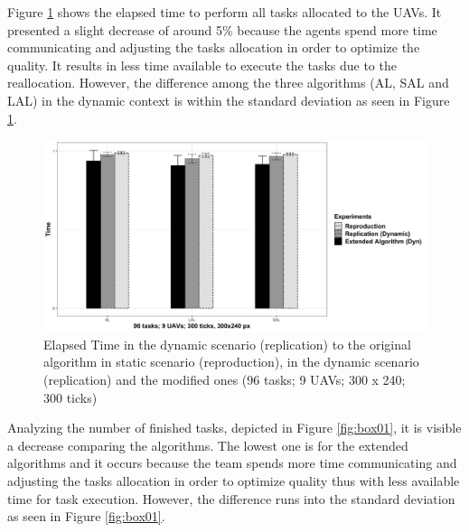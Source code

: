  Figure \ref{fig:din02} shows the elapsed time to perform all tasks allocated to the UAVs. It presented a slight decrease of around 5\% because the agents spend more time communicating and adjusting the tasks allocation in order to optimize the quality. It results in less time available to execute the tasks due to the reallocation. However, the difference among the three algorithms (AL, SAL and LAL) in the dynamic context is within the standard deviation as seen in Figure \ref{fig:din02}.
 
\begin{figure}[h!]
	\begin{center}
		\includegraphics[scale=0.15]{fig/GRAPH08.png}
		\caption{Elapsed Time  in the dynamic scenario (replication) to the original algorithm in static scenario (reproduction), in the dynamic scenario (replication) and the modified ones (96 tasks; 9 UAVs; 300 x 240; 300 ticks)}
		\label{fig:din02}
	\end{center}
\end{figure}

Analyzing the number of finished tasks, depicted in Figure \ref{fig:box01}, it is visible a decrease comparing the algorithms. The lowest one is for the extended algorithms and it occurs because the team spends more time communicating and adjusting the tasks allocation in order to optimize quality thus with less available time for task execution. However, the difference runs into the standard deviation as seen in Figure \ref{fig:box01}.

